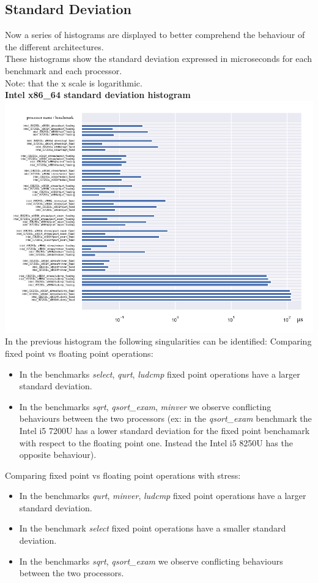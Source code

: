 \subsection{Standard Deviation}
Now a series of histograms are displayed to better comprehend the behaviour of the different architectures.\\ These histograms show the standard deviation expressed in microseconds for each benchmark and each processor.\\ Note: that the x scale is logarithmic.\\[0.2cm]
\textbf{Intel x86\_64 standard deviation histogram}\\
\hspace*{-3.2cm}
\includegraphics[width=570pt]{intel_stddev_histogram.pdf}
In the previous histogram the following singularities can be identified:
Comparing fixed point vs floating point operations:
\begin{itemize}
		\item In the benchmarks \textit{select}, \textit{qurt}, \textit{ludcmp} fixed point operations have a larger standard deviation.
		\item In the benchmarks \textit{sqrt}, \textit{qsort\_exam}, \textit{minver} we observe conflicting behaviours between the two processors (ex: in the \textit{qsort\_exam} benchmark the Intel i5 7200U has a lower standard deviation for the fixed point benchamark with respect to the floating point one. Instead the Intel i5 8250U has the opposite behaviour).
\end{itemize}
Comparing fixed point vs floating point operations with stress:
\begin{itemize}
		\item In the benchmarks \textit{qurt}, \textit{minver}, \textit{ludcmp} fixed point operations have a larger standard deviation.
		\item In the benchmark \textit{select} fixed point operations have a smaller standard deviation.
		\item In the benchmarks \textit{sqrt}, \textit{qsort\_exam} we observe conflicting behaviours between the two processors.
\end{itemize}

